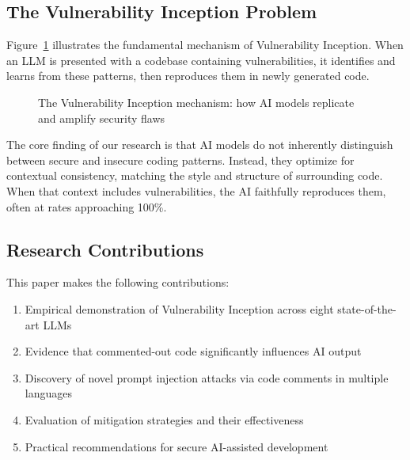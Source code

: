 \documentclass[11pt,a4paper]{article}
\begin{document}
\subsection{The Vulnerability Inception Problem}

Figure~\ref{fig:vuln_inception_flow} illustrates the fundamental mechanism of Vulnerability Inception. When an LLM is presented with a codebase containing vulnerabilities, it identifies and learns from these patterns, then reproduces them in newly generated code.

\begin{figure}[h]
\centering
{}
\caption{The Vulnerability Inception mechanism: how AI models replicate and amplify security flaws}
\label{fig:vuln_inception_flow}
\end{figure}

The core finding of our research is that AI models do not inherently distinguish between secure and insecure coding patterns. Instead, they optimize for contextual consistency, matching the style and structure of surrounding code. When that context includes vulnerabilities, the AI faithfully reproduces them, often at rates approaching 100\%.

\subsection{Research Contributions}

This paper makes the following contributions:

\begin{enumerate}
\item Empirical demonstration of Vulnerability Inception across eight state-of-the-art LLMs
\item Evidence that commented-out code significantly influences AI output
\item Discovery of novel prompt injection attacks via code comments in multiple languages
\item Evaluation of mitigation strategies and their effectiveness
\item Practical recommendations for secure AI-assisted development
\end{enumerate}
\end{document}
